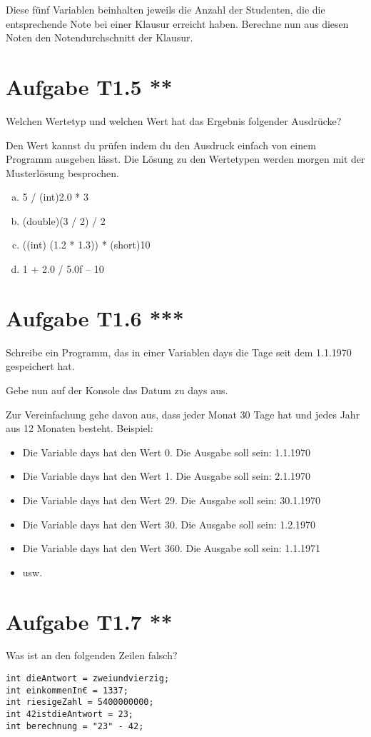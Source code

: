 \documentclass[final,a4paper]{article}
\begin{document}
Diese fünf Variablen beinhalten jeweils die Anzahl der Studenten, die die entsprechende Note bei einer Klausur erreicht haben. Berechne nun aus diesen Noten den Notendurchschnitt der Klausur.

\section*{Aufgabe T1.5 **}
Welchen Wertetyp und welchen Wert hat das Ergebnis folgender Ausdrücke? 

Den Wert kannst du prüfen indem du den Ausdruck einfach von einem Programm ausgeben lässt. Die Lösung zu den Wertetypen werden morgen mit der Musterlösung besprochen.
\begin{enumerate}[(a)]
\item 5 / (int)2.0 * 3
\item (double)(3 / 2) / 2
\item ((int) (1.2 * 1.3)) * (short)10
\item 1 + 2.0 / 5.0f – 10
\end{enumerate}


\section*{Aufgabe T1.6 ***}
Schreibe ein Programm, das in einer Variablen days die Tage seit dem 1.1.1970 gespeichert hat.

Gebe nun auf der Konsole das Datum zu days aus. 

Zur Vereinfachung gehe davon aus, dass jeder Monat 30 Tage hat und jedes Jahr aus 12 Monaten besteht.
Beispiel:
\begin{itemize}
\item Die Variable days hat den Wert 0. Die Ausgabe soll sein: 1.1.1970
\item Die Variable days hat den Wert 1. Die Ausgabe soll sein: 2.1.1970
\item Die Variable days hat den Wert 29. Die Ausgabe soll sein: 30.1.1970
\item Die Variable days hat den Wert 30. Die Ausgabe soll sein: 1.2.1970
\item Die Variable days hat den Wert 360. Die Ausgabe soll sein: 1.1.1971
\item usw.
\end{itemize}

\section*{Aufgabe T1.7 **}
Was ist an den folgenden Zeilen falsch?
\begin{lstlisting}
int dieAntwort = zweiundvierzig;
int einkommenIn€ = 1337;
int riesigeZahl = 5400000000;
int 42istdieAntwort = 23; 
int berechnung = "23" - 42;
\end{lstlisting}
\end{document}
